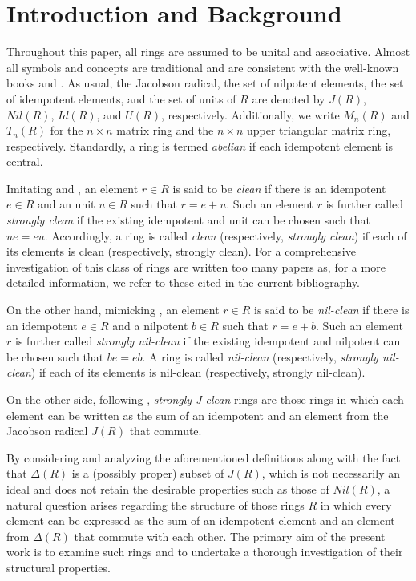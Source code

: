 \documentclass[12pt]{amsart}
\theoremstyle{definition}
\begin{document}
\section{Introduction and Background}

Throughout this paper, all rings are assumed to be unital and associative. Almost all symbols and concepts are traditional and are consistent with the well-known books \cite{lamf} and \cite{lame}. As usual, the Jacobson radical, the set of nilpotent elements, the set of idempotent elements, and the set of units of \( R \) are denoted by \( J(R) \), \( Nil(R) \), \( Id(R) \), and \( U(R) \), respectively. Additionally, we write $M_n(R)$ and $T_n(R)$ for the $n \times n$ matrix ring and the $n \times n$ upper triangular matrix ring, respectively. Standardly, a ring is termed {\it abelian} if each idempotent element is central.

Imitating \cite{2} and \cite{7}, an element $r \in R$ is said to be {\it clean} if there is an idempotent $e \in R$ and an unit $u \in R$ such that $r=e+u$. Such an element $r$ is further called {\it strongly clean} if the existing idempotent and unit can be chosen such that $ue=eu$. Accordingly, a ring is called {\it clean} (respectively, {\it strongly clean}) if each of its elements is clean (respectively, strongly clean). For a comprehensive investigation of this class of rings are written too many papers as, for a more detailed information, we refer to these cited in the current bibliography.

On the other hand, mimicking \cite{diesl}, an element $r\in R$ is said to be {\it nil-clean} if there is an idempotent $e \in R$ and a nilpotent $b \in R$ such that $r=e+b$. Such an element $r$ is further called {\it strongly nil-clean} if the existing idempotent and nilpotent can be chosen such that $be=eb$. A ring is called {\it nil-clean} (respectively, {\it strongly nil-clean}) if each of its elements is nil-clean (respectively, strongly nil-clean).

On the other side, following \cite{csj, chensjc}, \textit{strongly J-clean} rings are those rings in which each element can be written as the sum of an idempotent and an element from the Jacobson radical $J(R)$ that commute.

By considering and analyzing the aforementioned definitions along with the fact that $\Delta(R)$ is a (possibly proper) subset of $J(R)$, which is not necessarily an ideal and does not retain the desirable properties such as those of $Nil(R)$, a natural question arises regarding the structure of those rings $R$ in which every element can be expressed as the sum of an idempotent element and an element from $\Delta(R)$ that commute with each other. The primary aim of the present work is to examine such rings and to undertake a thorough investigation of their structural properties.
\end{document}
